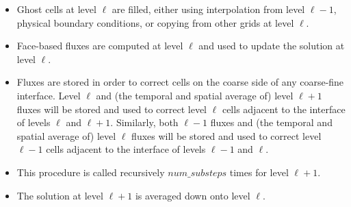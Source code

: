\begin{itemize}
\item Ghost cells at level $\ell$ are filled, either 
using interpolation from level $\ell-1$, physical boundary conditions, or 
copying from other grids at level $\ell$. 
\item Face-based fluxes are computed at level $\ell$ and used to update the solution at level $\ell$.
\item Fluxes are stored in order to correct cells on the coarse side of any
coarse-fine interface.   Level $\ell$ and (the temporal and spatial average of) 
level $\ell+1$ fluxes will be stored and used to correct level $\ell$ cells 
adjacent to the interface of levels $\ell$ and $\ell+1.$   Similarly, both
$\ell-1$ fluxes and (the temporal and spatial average of) level $\ell$ fluxes
will be stored and used to correct level $\ell-1$ cells 
adjacent to the interface of levels $\ell-1$ and $\ell.$ 
\item This procedure is called recursively $num\_substeps$ times for level $\ell+1.$
\item The solution at level $\ell+1$ is averaged down onto level $\ell$.
\end{itemize}

